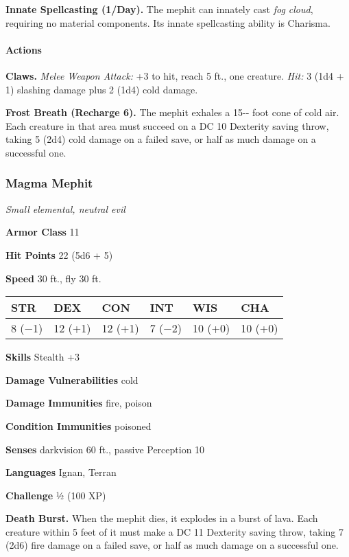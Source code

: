 \documentclass[
]{article}
\begin{document}
\textbf{Innate Spellcasting (1/Day).} The mephit can innately cast
\emph{fog cloud}, requiring no material components. Its innate
spellcasting ability is Charisma.

\hypertarget{actions-4}{%
\paragraph{Actions}\label{actions-4}}

\textbf{Claws.} \emph{Melee Weapon Attack:} +3 to hit, reach 5 ft., one
creature. \emph{Hit:} 3 (1d4 + 1) slashing damage plus 2 (1d4) cold
damage.

\textbf{Frost Breath (Recharge 6).} The mephit exhales a 15-­‐ foot cone
of cold air. Each creature in that area must succeed on a DC 10
Dexterity saving throw, taking 5 (2d4) cold damage on a failed save, or
half as much damage on a successful one.

\hypertarget{magma-mephit}{%
\subsubsection{Magma Mephit}\label{magma-mephit}}

\emph{Small elemental, neutral evil}

\textbf{Armor Class} 11

\textbf{Hit Points} 22 (5d6 + 5)

\textbf{Speed} 30 ft., fly 30 ft.

\begin{longtable}[]{@{}llllll@{}}
\toprule
STR & DEX & CON & INT & WIS & CHA\tabularnewline
\midrule
\endhead
8 (−1) & 12 (+1) & 12 (+1) & 7 (−2) & 10 (+0) & 10 (+0)\tabularnewline
\bottomrule
\end{longtable}

\textbf{Skills} Stealth +3

\textbf{Damage Vulnerabilities} cold

\textbf{Damage Immunities} fire, poison

\textbf{Condition Immunities} poisoned

\textbf{Senses} darkvision 60 ft., passive Perception 10

\textbf{Languages} Ignan, Terran

\textbf{Challenge} ½ (100 XP)

\textbf{Death Burst.} When the mephit dies, it explodes in a burst of
lava. Each creature within 5 feet of it must make a DC 11 Dexterity
saving throw, taking 7 (2d6) fire damage on a failed save, or half as
much damage on a successful one.
\end{document}
